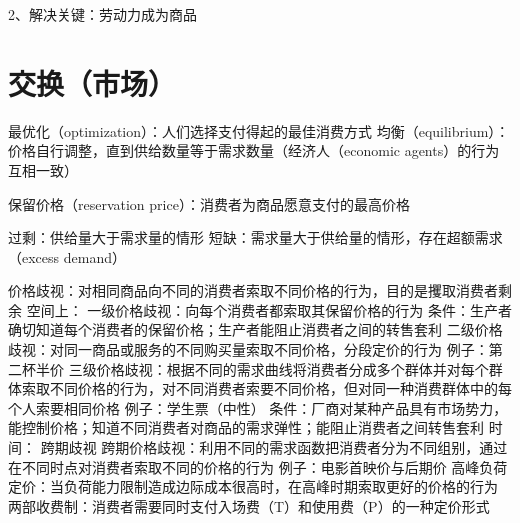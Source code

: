 \documentclass[12pt]{book}
\begin{document}
2、解决关键：劳动力成为商品
















\chapter{交换（市场）}


最优化（optimization）：人们选择支付得起的最佳消费方式
均衡（equilibrium）：价格自行调整，直到供给数量等于需求数量（经济人（economic agents）的行为互相一致）

保留价格（reservation price）：消费者为商品愿意支付的最高价格

过剩：供给量大于需求量的情形
短缺：需求量大于供给量的情形，存在超额需求（excess demand）

价格歧视：对相同商品向不同的消费者索取不同价格的行为，目的是攫取消费者剩余
    空间上：
        一级价格歧视：向每个消费者都索取其保留价格的行为
            条件：生产者确切知道每个消费者的保留价格；生产者能阻止消费者之间的转售套利
        二级价格歧视：对同一商品或服务的不同购买量索取不同价格，分段定价的行为
            例子：第二杯半价
        三级价格歧视：根据不同的需求曲线将消费者分成多个群体并对每个群体索取不同价格的行为，对不同消费者索要不同价格，但对同一种消费群体中的每个人索要相同价格
            例子：学生票（中性）
            条件：厂商对某种产品具有市场势力，能控制价格；知道不同消费者对商品的需求弹性；能阻止消费者之间转售套利
    时间：
        跨期歧视
            跨期价格歧视：利用不同的需求函数把消费者分为不同组别，通过在不同时点对消费者索取不同的价格的行为
                例子：电影首映价与后期价
            高峰负荷定价：当负荷能力限制造成边际成本很高时，在高峰时期索取更好的价格的行为
        两部收费制：消费者需要同时支付入场费（T）和使用费（P）的一种定价形式
    
\end{document}
